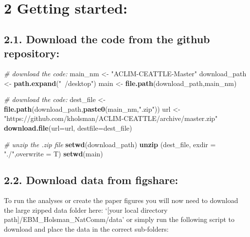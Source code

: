 \documentclass[]{article}
\newenvironment{Shaded}{\begin{snugshade}}{\end{snugshade}}
\newcommand{\KeywordTok}[1]{\textcolor[rgb]{0.13,0.29,0.53}{\textbf{{#1}}}}
\newcommand{\DataTypeTok}[1]{\textcolor[rgb]{0.13,0.29,0.53}{{#1}}}
\newcommand{\StringTok}[1]{\textcolor[rgb]{0.31,0.60,0.02}{{#1}}}
\newcommand{\CommentTok}[1]{\textcolor[rgb]{0.56,0.35,0.01}{\textit{{#1}}}}
\newcommand{\NormalTok}[1]{{#1}}
\begin{document}
\section{2 Getting started:}\label{getting-started}

\subsection{2.1. Download the code from the github
repository:}\label{download-the-code-from-the-github-repository}

\begin{Shaded}
\begin{Highlighting}[]
    \CommentTok{# download the code:}
    \NormalTok{main_nm       <-}\StringTok{ "ACLIM-CEATTLE-Master"}
    \NormalTok{download_path <-}\StringTok{ }\KeywordTok{path.expand}\NormalTok{(}\StringTok{"~/desktop"}\NormalTok{)}
    \NormalTok{main          <-}\StringTok{ }\KeywordTok{file.path}\NormalTok{(download_path,main_nm)}
   
    \CommentTok{# download the code:}
    \NormalTok{dest_file     <-}\StringTok{ }\KeywordTok{file.path}\NormalTok{(download_path,}\KeywordTok{paste0}\NormalTok{(main_nm,}\StringTok{".zip"}\NormalTok{))}
    \NormalTok{url           <-}\StringTok{"https://github.com/kholsman/ACLIM-CEATTLE/archive/master.zip"}
    \KeywordTok{download.file}\NormalTok{(}\DataTypeTok{url=}\NormalTok{url, }\DataTypeTok{destfile=}\NormalTok{dest_file)}
    
    \CommentTok{# unzip the .zip file}
    \KeywordTok{setwd}\NormalTok{(download_path)}
    \KeywordTok{unzip} \NormalTok{(dest_file, }\DataTypeTok{exdir =} \StringTok{"./"}\NormalTok{,}\DataTypeTok{overwrite =} \NormalTok{T)}
    \KeywordTok{setwd}\NormalTok{(main)}
\end{Highlighting}
\end{Shaded}

\subsection{2.2. Download data from
figshare:}\label{download-data-from-figshare}

To run the analyses or create the paper figures you will now need to
download the large zipped data folder here: `{[}your local directory
path{]}/EBM\_Holsman\_NatComm/data' or simply run the following script
to download and place the data in the correct sub-folders:
\end{document}
